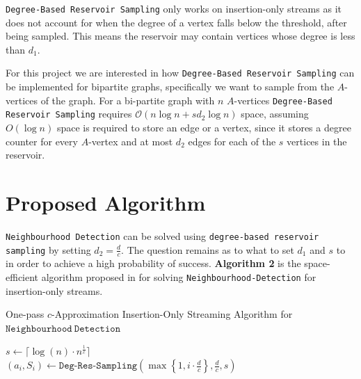 \documentclass[11pt,twoside,a4paper]{report}
\begin{document}
\par \texttt{Degree-Based Reservoir Sampling} only works on insertion-only streams as it does not account for when the degree of a vertex falls below the threshold, after being sampled. This means the reservoir may contain vertices whose degree is less than $d_1$.

\par For this project we are interested in how \texttt{Degree-Based Reservoir Sampling} can be implemented for bipartite graphs, specifically we want to sample from the $A$-vertices of the graph. For a bi-partite graph with $n$ $A$-vertices \texttt{Degree-Based Reservoir Sampling} requires $\mathcal{O}(n\log n+sd_2\log n)$ space, assuming $O(\log n)$ space is required to store an edge or a vertex, since it stores a degree counter for every $A$-vertex and at most $d_2$ edges for each of the $s$ vertices in the reservoir.

\section{Proposed Algorithm}


\texttt{Neighbourhood Detection} can be solved using \texttt{degree-based reservoir sampling} by setting $d_2=\frac{d}c$. The question remains as to what to set $d_1$ and $s$ to in order to achieve a high probability of success. \textbf{Algorithm 2} is the space-efficient algorithm proposed in \cite{orig} for solving \texttt{Neighbourhood-Detection} for insertion-only streams.

\begin{algorithm}
	\caption{One-pass $c$-Approximation Insertion-Only Streaming Algorithm for $\mathtt{Neighbourhood\ Detection}$}
	$s\leftarrow\lceil\log(n)\cdot n^{\frac1c}\rceil$\\
	 {
		$(a_i,S_i)\leftarrow\mathtt{Deg}\mbox{-}\mathtt{Res}\mbox{-}\mathtt{Sampling}\left(\max\left\{1,i\cdot\frac{d}{c}\right\},\frac{d}c,s\right)$
	}
\end{algorithm}
\end{document}
